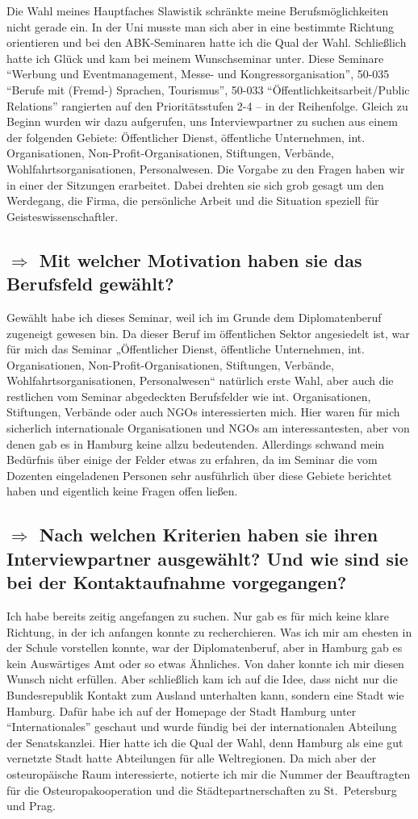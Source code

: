 \documentclass[12pt,headsepline,a4paper]{scrartcl}
\newcommand\quest[1]{\subsection*{$\Rightarrow$ #1}}
\begin{document}
Die Wahl meines Hauptfaches Slawistik schränkte meine Berufsmöglichkeiten nicht gerade ein. In der Uni musste man sich aber in eine bestimmte Richtung orientieren und bei den ABK-Seminaren hatte ich die Qual der Wahl. Schließlich hatte ich Glück und kam bei meinem Wunschseminar unter. Diese Seminare ``Werbung und Eventmanagement, Messe- und Kongressorganisation'', 50-035 ``Berufe mit (Fremd-) Sprachen, Tourismus'', 50-033 ``Öffentlichkeitsarbeit/Public Relations'' rangierten auf den Prioritätsstufen 2-4 -- in der Reihenfolge. 
Gleich zu Beginn wurden wir dazu aufgerufen, uns Interviewpartner zu suchen aus einem der folgenden Gebiete: Öffentlicher Dienst, öffentliche Unternehmen, int. Organisationen, Non-Profit-Organisationen, Stiftungen, Verbände, Wohlfahrtsorganisationen, Personalwesen. 
Die Vorgabe zu den Fragen haben wir in einer der Sitzungen erarbeitet. Dabei drehten  sie sich grob gesagt um den Werdegang, die Firma, die persönliche Arbeit und die Situation speziell für Geisteswissenschaftler.

\quest{Mit welcher Motivation haben sie das Berufsfeld gewählt?}
Gewählt habe ich dieses Seminar, weil ich im Grunde dem  Diplomatenberuf zugeneigt gewesen bin. Da dieser Beruf im öffentlichen Sektor angesiedelt ist, war für mich das Seminar „Öffentlicher Dienst, öffentliche Unternehmen, int. Organisationen, 
Non-Profit-Organisationen, Stiftungen, Verbände, Wohlfahrtsorganisationen, Personalwesen“ natürlich erste Wahl, aber auch die restlichen vom Seminar abgedeckten Berufsfelder wie int. Organisationen, Stiftungen, Verbände oder auch NGOs interessierten mich. Hier waren für mich sicherlich internationale Organisationen und NGOs am interessantesten, aber von denen gab es in Hamburg keine allzu bedeutenden.
Allerdings schwand mein Bedürfnis über einige der Felder etwas zu erfahren, da im Seminar die vom Dozenten eingeladenen Personen sehr ausführlich über diese Gebiete berichtet haben und eigentlich keine Fragen offen ließen. 

\quest{Nach welchen Kriterien haben sie ihren Interviewpartner ausgewählt? Und wie sind sie bei der Kontaktaufnahme vorgegangen?}
Ich habe bereits zeitig angefangen zu suchen. Nur gab es für mich keine klare Richtung, in der ich anfangen konnte zu recherchieren. Was ich mir am ehesten in der Schule vorstellen konnte, war der Diplomatenberuf, aber in Hamburg gab es kein Auswärtiges Amt oder so etwas Ähnliches. Von daher konnte ich mir diesen Wunsch nicht erfüllen. Aber schließlich kam ich auf die Idee, dass nicht nur die Bundesrepublik Kontakt zum Ausland unterhalten kann, sondern eine Stadt wie Hamburg. Dafür habe ich auf der Homepage der Stadt Hamburg unter "`Internationales"' geschaut und wurde fündig bei der internationalen Abteilung der Senatskanzlei. Hier hatte ich die Qual der Wahl, denn Hamburg als eine gut vernetzte Stadt hatte Abteilungen für alle Weltregionen.
Da mich aber der osteuropäische Raum interessierte, notierte ich mir die Nummer der Beauftragten für die Osteuropakooperation und die Städtepartnerschaften zu St.\ Petersburg und Prag.
\end{document}
